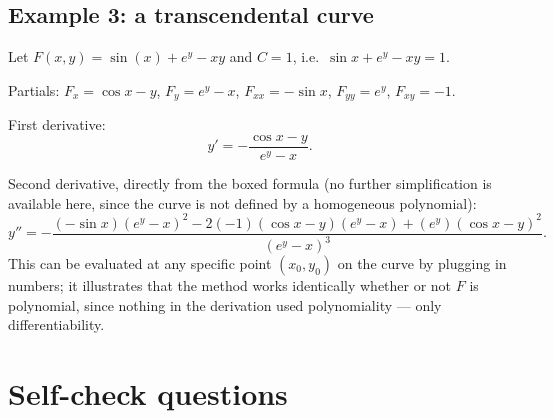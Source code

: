 \documentclass{essay}
\begin{document}
\subsection*{Example 3: a transcendental curve}

Let \(F(x,y) = \sin(x) + e^{y} - xy\) and \(C = 1\), i.e.\ \(\sin x + e^{y} - xy = 1\).

Partials: \(F_{x} = \cos x - y\), \(F_{y} = e^{y} - x\), \(F_{xx} = -\sin x\), \(F_{yy} = e^{y}\),
\(F_{xy} = -1\).

First derivative:
\[ y' = -\frac{\cos x - y}{e^{y} - x}. \]

Second derivative, directly from the boxed formula (no further simplification is available
here, since the curve is not defined by a homogeneous polynomial):
\[ y'' = -\frac{(-\sin x)(e^{y}-x)^{2} - 2(-1)(\cos x - y)(e^{y} - x) + (e^{y})(\cos x - y)^{2}}{(e^{y} - x)^{3}}. \]
This can be evaluated at any specific point \((x_{0}, y_{0})\) on the curve by plugging in numbers;
it illustrates that the method works identically whether or not \(F\) is polynomial, since
nothing in the derivation used polynomiality — only differentiability.

\section{Self-check questions}
\end{document}
